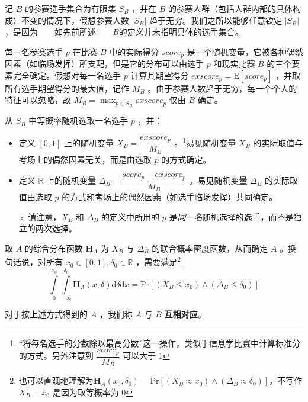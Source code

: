 \begin{definition}
                \begin{asparaenum}[\bfseries{步骤} 1.]
                    \item 记 $B$ 的参赛选手集合为有限集 $S_B$ ，并在 $B$ 的参赛人群（包括人群内部的具体构成）不变的情况下，假想参赛人数 $\left|S_B\right|$ 趋于无穷。我们之所以能够任意钦定 $\left|S_B\right|$ ，是因为——如先前所述——$B$的定义并未指明具体的选手集合。
                    \item 每一名参赛选手 $p$ 在比赛 $B$ 中的实际得分 $\textit{score}_p$ 是一个随机变量，它被各种偶然因素（如临场发挥）所支配，但是它的分布可以由选手 $p$ 和现实比赛 $B$ 的三个要素完全确定。假想对每一名选手 $p$ 计算其期望得分 $\textit{exscore}_p=\mathrm{E}\left[\textit{score}_p\right]$ ，并取所有选手期望得分的最大值，记作 $M_B$ 。由于参赛人数趋于无穷，每一个个人的特征可以忽略，故 $M_B=\max_{p\in S_B} \textit{exscore}_p$ 仅由 $B$ 确定。
                    \item 从 $S_B$ 中等概率随机选取一名选手 $p$ ，并：
                    \begin{itemize}[leftmargin=4em]
                        \item 定义 $[0,1]$ 上的随机变量 $X_B=\dfrac{\textit{exscore}_p}{M_B}$ 。\footnote{“将每名选手的分数除以最高分数”这一操作，类似于信息学比赛中计算标准分的方式。另外注意到 $\dfrac{score_p}{M_B}$ 可以大于 $1$ }易见随机变量 $X_B$ 的实际取值与考场上的偶然因素无关，而是由选取 $p$ 的方式确定。
                        \item 定义 $\mathbb{R}$ 上的随机变量 $\Delta_B=\dfrac{\textit{score}_p-\textit{exscore}_p}{M_B}$ 。易见随机变量 $\Delta_B$ 的实际取值由选取 $p$ 的方式和考场上的偶然因素（如选手临场发挥）共同确定。
                        \item [◦] 请注意，$X_B$ 和 $\Delta_B$ 的定义中所用的 $p$ 是\emph{同一名}随机选择的选手，而不是独立的两次选择。
                    \end{itemize}
                    \item 取 $A$ 的综合分布函数 $\bm{H}_A$ 为 $X_B$ 与 $\Delta_B$ 的联合概率密度函数，从而确定 $A$ 。换句话说，对所有 $x_0\in[0,1],\delta_0\in\mathbb{R}$ ，需要满足\footnote{也可以直观地理解为$\bm{H}_A(x_0,\delta_0)=\mathrm{Pr}\left[\left(X_B\approx x_0\right)\land\left(\Delta_B\approx\delta_0\right)\right]$，不写作 $X_B=x_0$ 是因为取等概率为 $0$ }
                    $$
                    \int\limits_0^{x_0}\int\limits_{-\infty}^{\delta_0} \bm{H}_A(x,\delta)\mathrm{d}\delta\mathrm{d}x=\mathrm{Pr}\left[\left(X_B\leq x_0\right)\land\left(\Delta_B\leq\delta_0\right)\right]
                    $$

                \end{asparaenum}

                对于按上述方式得到的 $A$ ，我们称 $A$ 与 $B$ \textbf{互相对应}。
                \label{def:realIdealCorrespondence}
            \end{definition}

